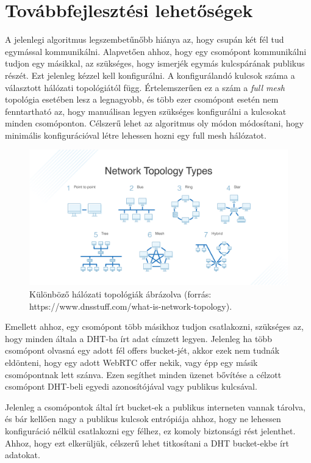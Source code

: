 \chapter{Továbbfejlesztési lehetőségek}\label{ch:továbbfejlesztési-lehetőségek}

A jelenlegi algoritmus legszembetűnőbb hiánya az, hogy csupán két fél tud egymással kommunikálni.
Alapvetően ahhoz, hogy egy csomópont kommunikálni tudjon egy másikkal, az szükséges, hogy ismerjék egymás kulcspárának
publikus részét.
Ezt jelenleg kézzel kell konfigurálni.
A konfigurálandó kulcsok száma a választott hálózati topológiától függ.
Értelemszerűen ez a szám a \emph{full mesh} topológia esetében lesz a legnagyobb, és több ezer csomópont esetén nem fenntartható
az, hogy manuálisan legyen szükséges konfigurálni a kulcsokat minden csomóponton.
Célszerű lehet az algoritmus oly módon módosítani, hogy minimális konfigurációval létre lehessen hozni egy full mesh
hálózatot.

\begin{figure}[!ht]
    \centering
    \includegraphics[width=140mm, keepaspectratio]{figures/topology}
    \caption{Különböző hálózati topológiák ábrázolva (forrás: https://www.dnsstuff.com/what-is-network-topology).}
    \label{fig:topo}
\end{figure}

Emellett ahhoz, egy csomópont több másikhoz tudjon csatlakozni, szükséges az, hogy minden általa a DHT-ba írt adat címzett
legyen.
Jelenleg ha több csomópont olvasná egy adott fél offers bucket-jét, akkor ezek nem tudnák eldönteni, hogy egy adott WebRTC
offer nekik, vagy épp egy másik csomópontnak lett szánva.
Ezen segíthet minden üzenet bővítése a célzott csomópont DHT-beli egyedi azonosítójával vagy publikus kulcsával.

Jelenleg a csomópontok által írt bucket-ek a publikus interneten vannak tárolva, és bár kellően nagy a publikus kulcsok
entrópiája ahhoz, hogy ne lehessen konfiguráció nélkül csatlakozni egy félhez, ez komoly biztonsági rést jelenthet.
Ahhoz, hogy ezt elkerüljük, célszerű lehet titkosítani a DHT bucket-ekbe írt adatokat.
